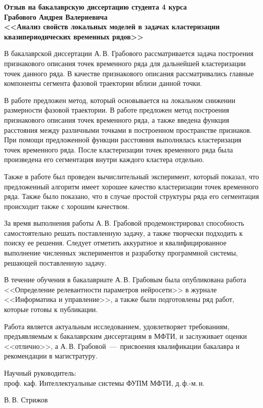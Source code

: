 \documentclass[12pt]{article}
\begin{document}
\thispagestyle{empty}
\begin{center}
\bigskip

\textbf{Отзыв на бакалаврскую диссертацию студента 4 курса\\
Грабового Андрея Валериевича\\
<<Анализ свойств локальных моделей в задачах кластеризации квазипериодических временных рядов>>}
\end{center}

В бакалаврской диссертации А.\,В. Грабового рассматривается задача построения признакового описания точек временного ряда для дальнейшей кластеризации точек данного ряда. В качестве признакового описания рассматривались главные компоненты сегмента фазовой траектории вблизи данной точки.

В работе предложен метод, который основывается на локальном снижении размерности фазовой траектории. В работе предложен метод построения признакового описания точек временного ряда, а также введена функция расстояния между различными точками в построенном пространстве признаков. При помощи предложенной функции расстояния выполнялась кластеризация точек временного ряда. После кластеризации точек временного ряда была произведена его сегментация внутри каждого кластера отдельно.

Также в работе был проведен вычислительный эксперимент, который показал, что предложенный алгоритм имеет хорошее качество кластеризации точек временного ряда. Также было показано, что в случае простой структуры ряда его сегментация происходит также с хорошим качеством.

За время выполнения работы А.\,В. Грабовой продемонстрировал способность самостоятельно решать поставленную задачу, а также творчески подходить к поиску ее решения. Следует отметить аккуратное и квалифицированное выполнение численных экспериментов и разработку программной системы, решающей поставленную задачу.

В течение обучения в бакалавриате А.\,В. Грабовым была опубликована работа <<Определение релевантности параметров нейросети>> в журнале <<Информатика и управление>>, а также были подготовлены ряд работ, которые готовы к публикации.

Работа является актуальным исследованием, удовлетворяет требованиям, предъявляемым к бакалаврским диссертациям в МФТИ, и заслуживает оценки <<отлично>>, а А.\,В. Грабовой~---~присвоения квалификации бакалавра и рекомендации в магистратуру.


\vspace{3cm}
\begin{flushleft}
Научный руководитель:\\
проф. каф. Интеллектуальные системы ФУПМ МФТИ, д.\,ф.-м.\,н.\\
\end{flushleft}
\begin{flushright}
В.\,В. Стрижов
\end{flushright}
\end{document}
